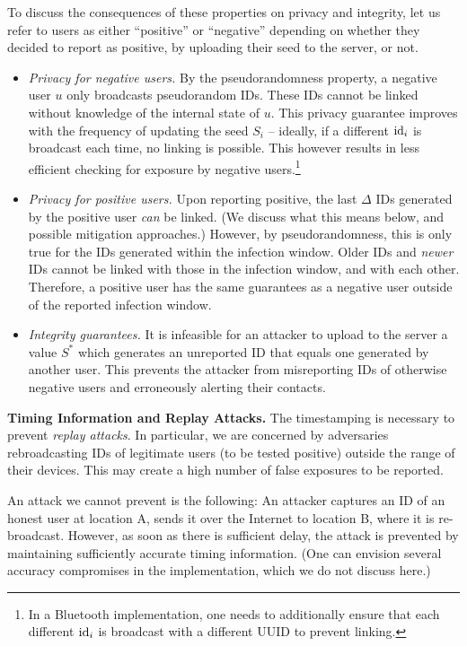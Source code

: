 \documentclass{article}
\begin{document}
To discuss the consequences of these properties on privacy and integrity, let us refer to users as either ``positive'' or ``negative'' depending on whether they decided to report as positive, by uploading their seed to the server, or not. 
\begin{itemize}
    \item {\em Privacy for negative users.}  By the pseudorandomness property, a negative user $u$ only broadcasts pseudorandom IDs. These IDs cannot be linked without knowledge of the internal state of $u$. This privacy guarantee improves with the frequency of updating the seed $S_i$ -- ideally, if a different $\mathrm{id}_i$ is broadcast each time, no linking is possible. This however results in less efficient checking for exposure by negative users.\footnote{In a Bluetooth implementation, one needs to additionally ensure that each different $\mathrm{id}_i$ is broadcast with a different UUID to prevent linking.}
    \item {\em Privacy for positive users.} Upon reporting positive, the last $\Delta$ IDs generated by the positive user {\em can} be linked. (We discuss what this means below, and possible mitigation approaches.) However, by pseudorandomness, this is only true for the IDs generated within the infection window. Older IDs and {\em newer} IDs cannot be linked with those in the infection window, and with each other. Therefore, a positive user has the same guarantees as a negative user outside of the reported infection window.
    \item {\em Integrity guarantees.} It is infeasible for an attacker to upload to the server a value $S^*$ which generates an unreported ID that equals one generated by another user. This prevents the attacker from misreporting IDs of otherwise negative users and erroneously alerting their contacts.  
\end{itemize}

{\bf Timing Information and Replay Attacks.} 
The timestamping is necessary to prevent {\em replay attacks}. In particular, we are concerned by adversaries rebroadcasting IDs of legitimate users (to be tested positive) outside the range of their devices. This may create a high number of false exposures to be reported. 

An attack we cannot prevent is the following: An attacker captures an ID of an honest user at location A, sends it over the Internet to location B, where it is re-broadcast.  However, as soon as there is sufficient delay, the attack is prevented by maintaining sufficiently accurate timing information. (One can envision several accuracy compromises in the implementation, which we do not discuss here.)
\end{document}
